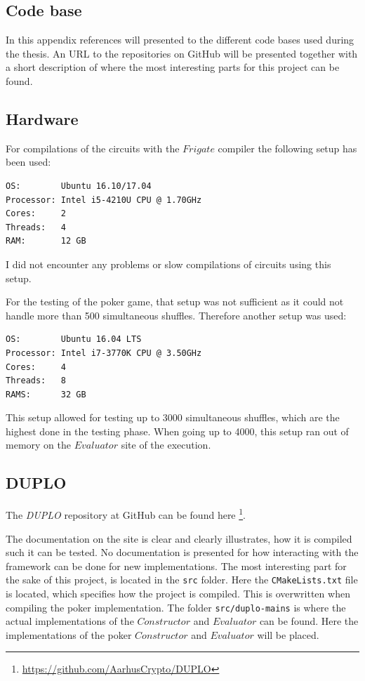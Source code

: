 \documentclass[twoside,11pt,openright]{report}
\newcommand{\DUPLO}{\textit{DUPLO} }
\begin{document}
\begin{appendices}
\chapter{Code base}
In this appendix references will presented to the different code bases used during the thesis. An URL to the repositories on GitHub will be presented together with a short description of where the most interesting parts for this project can be found.

\section{Hardware}
\label{app:hardware}
For compilations of the circuits with the $Frigate$ compiler the following setup has been used:

\begin{center}
\begin{verbatim}
OS:        Ubuntu 16.10/17.04
Processor: Intel i5-4210U CPU @ 1.70GHz
Cores:     2
Threads:   4
RAM:       12 GB
\end{verbatim}
\end{center}

I did not encounter any problems or slow compilations of circuits using this setup.

\bigskip
For the testing of the poker game, that setup was not sufficient as it could not handle more than 500 simultaneous shuffles. Therefore another setup was used:

\begin{center}
\begin{verbatim}
OS:        Ubuntu 16.04 LTS
Processor: Intel i7-3770K CPU @ 3.50GHz
Cores:     4
Threads:   8
RAMS:      32 GB
\end{verbatim}
\end{center}

This setup allowed for testing up to 3000 simultaneous shuffles, which are the highest done in the testing phase. When going up to 4000, this setup ran out of memory on the $Evaluator$ site of the execution.


\section{DUPLO}
\label{app:duplo}
The \DUPLO repository at GitHub can be found here \footnote{\url{https://github.com/AarhusCrypto/DUPLO}}.

The documentation on the site is clear and clearly illustrates, how it is compiled such it can be tested. No documentation is presented for how interacting with the framework can be done for new implementations. The most interesting part for the sake of this project, is located in the \verb|src| folder. Here the \verb|CMakeLists.txt| file is located, which specifies how the project is compiled. This is overwritten when compiling the poker implementation. The folder \verb|src/duplo-mains| is where the actual implementations of the $Constructor$ and $Evaluator$ can be found. Here the implementations of the poker $Constructor$ and $Evaluator$ will be placed.


\end{appendices}
\end{document}
